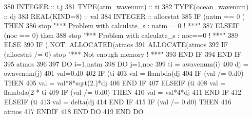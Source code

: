 \begin{DoxyCode}
380     \textcolor{keywordtype}{INTEGER} :: i,j
381     \textcolor{keywordtype}{TYPE}(atm\_wavenum) :: ti
382     \textcolor{keywordtype}{TYPE}(ocean\_wavenum) :: dj
383     \textcolor{keywordtype}{REAL(KIND=8)} :: val
384     \textcolor{keywordtype}{INTEGER} :: allocstat 
385     \textcolor{keywordflow}{IF} (natm == 0 ) \textcolor{keywordflow}{THEN}
386        stop \textcolor{stringliteral}{"*** Problem with calculate\_s : natm==0 ! ***"}
387     \textcolor{keywordflow}{ELSEIF} (noc == 0) \textcolor{keywordflow}{then}
388        stop \textcolor{stringliteral}{"*** Problem with calculate\_s : noc==0 ! ***"}
389     \textcolor{keywordflow}{ELSE}
390        \textcolor{keywordflow}{IF} (.NOT. \textcolor{keyword}{ALLOCATED}(atmos%
391           \textcolor{keyword}{ALLOCATE}(atmos%
392           \textcolor{keywordflow}{IF} (allocstat /= 0) stop \textcolor{stringliteral}{"*** Not enough memory ! ***"}
393 \textcolor{keywordflow}{       END IF}
394 \textcolor{keywordflow}{    END IF}
395     atmos%
396 
397     \textcolor{keywordflow}{DO} i=1,natm
398        \textcolor{keywordflow}{DO} j=1,noc
399           ti = awavenum(i)
400           dj = owavenum(j)
401           val=0.d0
402           \textcolor{keywordflow}{IF} (ti%
403              val = flambda(dj%
404              \textcolor{keywordflow}{IF} (val /= 0.d0) \textcolor{keywordflow}{THEN}
405                 val = val*8*sqrt(2.)*dj%
406 \textcolor{keywordflow}{             END IF}
407           \textcolor{keywordflow}{ELSEIF} (ti%
408              val = flambda(2 * ti%
409              \textcolor{keywordflow}{IF} (val /= 0.d0) \textcolor{keywordflow}{THEN}
410                 val = val*4*dj%
411 \textcolor{keywordflow}{             END IF}
412           \textcolor{keywordflow}{ELSEIF} (ti%
413              val = delta(dj%
414 \textcolor{keywordflow}{          END IF}
415           \textcolor{keywordflow}{IF} (val /= 0.d0) \textcolor{keywordflow}{THEN}
416              atmos%
417 \textcolor{keywordflow}{          ENDIF}
418 \textcolor{keywordflow}{       END DO}
419 \textcolor{keywordflow}{    END DO}
\end{DoxyCode}
